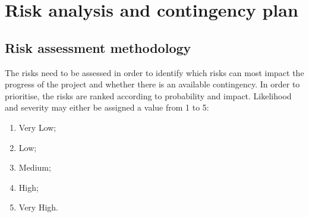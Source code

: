 \documentclass[a4paper]{article}
\begin{document}















\section{Risk analysis and contingency plan}


\subsection{Risk assessment methodology}

The risks need to be assessed in order to identify which risks can most impact the progress of the
project and whether there is an available contingency. In order to prioritise, the risks are ranked
according to probability and impact. Likelihood and severity may either be assigned a value from 1
to 5:

\begin{enumerate}

  \item Very Low;
  \item Low;
  \item Medium;
  \item High;
  \item Very High.

\end{enumerate}
\end{document}
